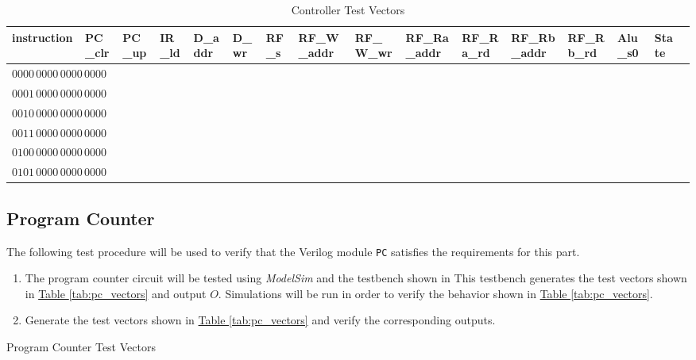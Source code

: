 \begin{sidewaystable}[htbp]
    \centering\scriptsize
        \begin{tabular}{llllllllllllllll} \toprule
            instruction              & PC\_clr   & PC\_up    & IR\_ld    & D\_addr   & D\_wr & RF\_s & RF\_W\_addr  & RF\_W\_wr    & RF\_Ra\_addr & RF\_Ra\_rd   & RF\_Rb\_addr & RF\_Rb\_rd   & Alu\_s0     & State \\\midrule
            $0000\,0000\,0000\,0000$ &   \\
            $0001\,0000\,0000\,0000$ &   \\
            $0010\,0000\,0000\,0000$ &   \\
            $0011\,0000\,0000\,0000$ &   \\
            $0100\,0000\,0000\,0000$ &   \\
            $0101\,0000\,0000\,0000$ &   \\
        \end{tabular}
    \caption{Controller Test Vectors\label{tab:controller_vectors}}
\end{sidewaystable}

\subsection{Program Counter} %
\label{sub:program_counter}

The following test procedure will be used to verify that the Verilog module \verb|PC| satisfies the requirements for this part.

\begin{enumerate}
    \item The program counter circuit will be tested using \emph{ModelSim} and the testbench shown in %
    This testbench generates the test vectors shown in \hyperref[tab:pc_vectors]{Table \ref*{tab:pc_vectors}} and output $O$.
    Simulations will be run in order to verify the behavior shown in \hyperref[tab:pc_vectors]{Table \ref*{tab:pc_vectors}}.
    \item Generate the test vectors shown in \hyperref[tab:pc_vectors]{Table \ref*{tab:pc_vectors}}
    and verify the corresponding outputs.
\end{enumerate}

\begin{table}[htbp]
    \centering
    \caption{Program Counter Test Vectors\label{tab:pc_vectors}}
\end{table}

